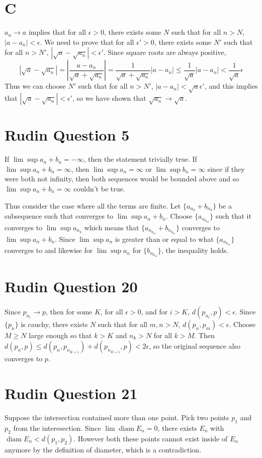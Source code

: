 \documentclass{article}
\begin{document}
\section*{C}
$a_n \to a$ implies that for all $\epsilon > 0$, 
there exists some $N$ such that for all $n > N$,
$|a-a_n| < \epsilon$.
We need to prove that for all $\epsilon' > 0$,
there exists some $N'$ such that for all $n > N'$,
$|\sqrt{a}-\sqrt{a_n}| < \epsilon'$.
Since square roots are always positive,
\[
	|\sqrt{a}-\sqrt{a_n}| = 
	|\frac{a-a_n}{\sqrt{a}+\sqrt{a_n}}| = 
	\frac{1}{\sqrt{a}+\sqrt{a_n}}|a-a_n| \leq 
	\frac{1}{\sqrt{a}}|a-a_n| <
	\frac{1}{\sqrt{a}} \epsilon
\]
Thus we can choose $N'$ such that for all $n>N'$,
$|a-a_n| < \sqrt{a}\epsilon'$, and this implies that 
$|\sqrt{a}-\sqrt{a_n}| < \epsilon'$,
so we have shown that $\sqrt{a_n} \to \sqrt{a}$.
\newpage 

\section*{Rudin Question 5}
If $\lim \sup a_n + b_n = -\infty$, then the statement trivially true.
If $\lim \sup a_n + b_n = \infty$, then $\lim \sup a_n = \infty$
or $\lim \sup b_n = \infty$ since if they were both not infinity,
then both sequences would be bounded above and so $\lim \sup a_n + b_n = \infty$ couldn't be true.

Thus consider the case where all the terms are finite.
Let $\{a_{n_k} + b_{n_k}\}$ be a subsequence such that converges to $\lim \sup a_n + b_n$.
Choose $\{a_{n_{k_m}}\}$  such that it converges to $\lim \sup a_{n_k}$
which means that $\{a_{n_{k_m}} + b_{n_{k_m}}\}$ converges to $\lim \sup a_n + b_n$.
Since $\lim \sup a_n$ is greater than or equal to what $\{a_{n_{k_m}}\}$ converges to 
and likewise for $\lim \sup a_n$ for $\{b_{n_{k_m}}\}$, the inequality holds.
\newpage 

\section*{Rudin Question 20}
Since $p_{n_i} \to p$, then for some $K$, for all $\epsilon>0$,
and for $i > K$, $d(p_{n_i}, p) < \epsilon$.
Since $\{p_n\}$ is cauchy, there exists $N$ such that for all $m, n > N$,
$d(p_n, p_m) < \epsilon$.
Choose $M\geq N$ large enough so that $k > K$ and $n_k > N$ for all $k > M$. 
Then $d(p_n, p) \leq d(p_n, p_{n_{K+1}}) + d(p_{n_{K+1}}, p) < 2\epsilon$,
so the original sequence also converges to $p$.
\newpage

\section*{Rudin Question 21}
Suppose the intersection contained more than one point.
Pick two points $p_1$ and $p_2$ from the interesection.
Since $\lim \operatorname{diam} E_n = 0$,
there exists $E_n$ with $\operatorname{diam} E_n < d(p_1, p_2)$.
However both these points cannot exist inside of $E_n$ anymore
by the definition of diameter, which is a contradiction.
\newpage
\end{document}
